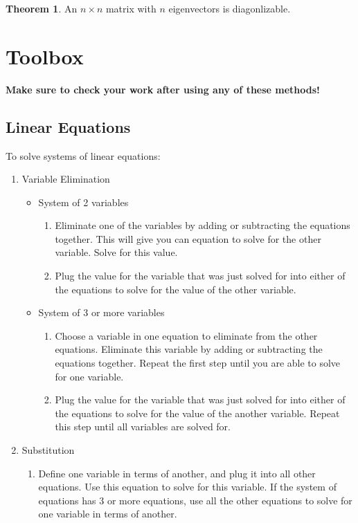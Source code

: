 \documentclass[a4paper,12pt]{article}
\theoremstyle{definition}
\newtheorem{theorem}{Theorem}
\theoremstyle{definition}
\begin{document}
	\begin{theorem}
		\label{thm:eigenvec-diagonlization-thm}
		An $n \times n$ matrix with $n$ eigenvectors is diagonlizable.
	\end{theorem}
	\newpage
	
	\section{Toolbox}
	\textbf{Make sure to check your work after using any of these methods!}
	
	\subsection{Linear Equations}
	To solve systems of linear equations:
	\begin{enumerate}
		\item Variable Elimination
		\begin{itemize}
			\item System of 2 variables
			\begin{enumerate}
				\item Eliminate one of the variables by adding or subtracting the equations together. This will give you can equation to solve for the other variable. Solve for this value.
				\item Plug the value for the variable that was just solved for into either of the equations to solve for the value of the other variable.
			\end{enumerate}
			\item System of 3 or more variables
			\begin{enumerate}
				\item Choose a variable in one equation to eliminate from the other equations. Eliminate this variable by adding or subtracting the equations together. Repeat the first step until you are able to solve for one variable.
				\item Plug the value for the variable that was just solved for into either of the equations to solve for the value of the another variable. Repeat this step until all variables are solved for.
			\end{enumerate}
		\end{itemize}
		\item Substitution
		\begin{enumerate}
			\item Define one variable in terms of another, and plug it into all other equations. Use this equation to solve for this variable. If the system of equations has 3 or more equations, use all the other equations to solve for one variable in terms of another.
		\end{enumerate}
	\end{enumerate}
\end{document}
